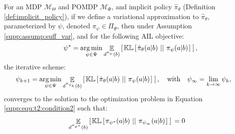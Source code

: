 \begin{lemma}\label{supp:lemma:2}
    For an MDP $\mathcal{M}_{\Theta}$ and POMDP $\mathcal{M}_{\Phi}$, and implicit policy $\hat{\pi}_{\theta}$ (Definition \ref{def:implicit_policy}), if we define a variational approximation to $\hat{\pi}_{\theta}$, parameterized by $\psi$, denoted $\pi_{\psi} \in \Pi_{\Psi}$, then under Assumption \ref{supp:assump:suff_var}, and for the following AIL objective:
    \begin{equation}
       \quad \psi^* = \mathop{\operatorname{arg\,min}}_{\psi \in \Psi} \mathop{\mathbb{E}}_{d^{\pi_{\psi}}(b)} \left[ \hspace*{0.1em}{}  \mathbb{KL} \left[ \hspace*{0.1em}{}  \hat{\pi}_{\theta}(a|b) \ ||\ {} \pi_\psi(a|b) \hspace*{0.1em} \right]{}  \hspace*{0.1em} \right]{} ,\label{supp:equ:t2:condition2}
    \end{equation}
    the iterative scheme:
    \begin{align}
        \label{supp:equ:t2:condition1}
       \psi_{k+1} &= \mathop{\operatorname{arg\,min}}_{\psi \in \Psi}  \mathop{\mathbb{E}}_{d^{\pi_{\psi_k}}(b)}  \left[ \hspace*{0.1em}{}  \mathbb{KL} \left[ \hspace*{0.1em}{}  \hat{\pi}_{\theta}(a|b) \ ||\ {} \pi_\psi(a|b) \hspace*{0.1em} \right]{}  \hspace*{0.1em} \right]{} ,  \quad \text{with} \quad \psi_{\infty} = \lim_{k \rightarrow \infty} \psi_k,
    \end{align}
    converges to the solution to the optimization problem in Equation \eqref{supp:equ:t2:condition2} such that:
    \begin{align}
        \mathop{\mathbb{E}}_{d^{\pi_{\psi^*}}(b)}  \left[ \hspace*{0.1em}{}  \mathbb{KL} \left[ \hspace*{0.1em}{}  \pi_{\psi^*}(a|b) \ ||\ {} \pi_{\psi_{\infty}}(a|b) \hspace*{0.1em} \right]{}  \hspace*{0.1em} \right]{}  = 0 \label{supp:equ:l2:result}
    \end{align}
\end{lemma}
